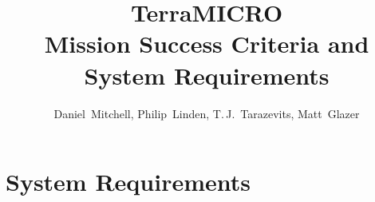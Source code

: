 \documentclass[conf]{new-aiaa}
\title{TerraMICRO \\ Mission Success Criteria and System Requirements}
\author{Daniel~Mitchell, Philip~Linden, T.\,J.~Tarazevits, Matt~Glazer}
\affil{\github{TerraHAB/TerraMICRO}}
\begin{document}
\maketitle%

\newcommand\subdir{tex} %



\section{System Requirements}
    

% 
% 

%     
\end{document}

